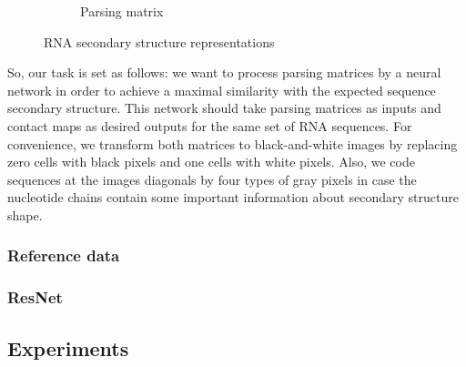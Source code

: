 \documentclass[runningheads]{llncs}
\begin{document}
\begin{figure}[h]
\begin{subfigure}{.3\textwidth}
  \caption{Parsing matrix}
  \label{struc_c}
\end{subfigure}
\caption{RNA secondary structure representations}
\label{struc}
\end{figure}

So, our task is set as follows: we want to process parsing matrices by a neural network in order to achieve a maximal similarity with the expected sequence secondary structure. This network should take parsing matrices as inputs and contact maps as desired outputs for the same set of RNA sequences. For convenience, we transform both matrices to black-and-white images by replacing zero cells with black pixels and one cells with white pixels. Also, we code sequences at the images diagonals by four types of gray pixels in case the nucleotide chains contain some important information about secondary structure shape.

\subsubsection{Reference data}

\subsubsection{ResNet}

\subsection{Experiments}

%
 

\end{document}
